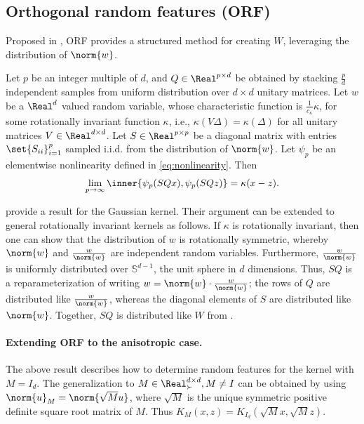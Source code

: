 \documentclass{article}
\def\cite{\citep}
\theoremstyle{plain}
\begin{document}
\subsection{Orthogonal random features (ORF)}
Proposed in \cite{yu2016orthogonal}, ORF provides a structured method for creating $ W$, leveraging the distribution of $\norm{w}$. 
\begin{proposition}\label{prop:orf_proof}
    Let $p$ be an integer multiple of $d$, and $Q\in\Real^{p\times d}$ be obtained by stacking $\frac{p}{d}$ independent samples from uniform distribution over $d\times d$ unitary matrices.
    Let $w$ be a $\Real^d$ valued random variable, whose characteristic function is $\frac1{c_\kappa}\kappa$, for some rotationally invariant function $\kappa$, i.e., $\kappa(V\Delta)=\kappa(\Delta)$ for all unitary matrices $V\in\Real^{d\times d}$. Let $S\in\Real^{p\times p}$ be a diagonal matrix with entries
    $\set{S_{ii}}_{i=1}^p$ sampled i.i.d. from the distribution of $\norm{w}$. Let $\psi_p$ be an elementwise nonlinearity defined in \cref{eq:nonlinearity}. Then
    \begin{align}
        \lim_{p\to\infty}\inner{\psi_p(SQx),\psi_p(SQz)}=\kappa(x-z).
    \end{align}
\end{proposition}
\cite{yu2016orthogonal} provide a result for the Gaussian kernel. Their argument can be extended to general rotationally invariant kernels as follows. If $\kappa$ is rotationally invariant, then one can show that the distribution of $w$ is rotationally symmetric, whereby $\norm{w}$ and $\frac{w}{\norm{w}}$ are independent random variables. Furthermore, $\frac{w}{\norm{w}}$ is uniformly distributed over $\mathbb{S}^{d-1}$, the unit sphere in $d$ dimensions. Thus, $SQ$ is a reparameterization of writing $w=\norm{w}\cdot\frac{w}{\norm{w}}$; the rows of $Q$ are distributed like $\frac{w}{\norm{w}}$, whereas the diagonal elements of $S$ are distributed like $\norm{w}$. Together, $SQ$ is distributed like $W$ from .
 \paragraph{Extending ORF to the anisotropic case.} The above result describes how to determine random features for the kernel with $M=I_d$. The generalization to $M \in \Real^{d\times d}_\succ,  M\neq I$ can be obtained by using $\norm{u}_M = \norm{\sqrt{M}u}$,
 where $\sqrt{M}$ is the unique symmetric positive definite square root matrix of $M.$ Thus $K_M(x,z)=K_{I_d}(\sqrt{M}x,\sqrt{M}z)$. 
\end{document}
